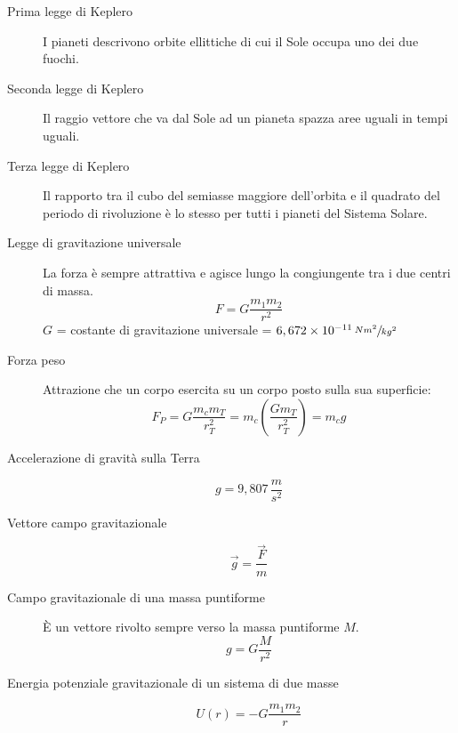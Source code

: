 \documentclass[a4paper,11pt,italian]{article}
\begin{document}
\begin{description}
  \item[Prima legge di Keplero]  
  I pianeti descrivono orbite ellittiche di cui il Sole occupa uno dei due fuochi.
  
  \item[Seconda legge di Keplero] 
  Il raggio vettore che va dal Sole ad un pianeta spazza aree uguali in tempi uguali.
  
  \item[Terza legge di Keplero] 
  Il rapporto tra il cubo del semiasse maggiore dell'orbita e il quadrato del periodo di rivoluzione è lo stesso per tutti i pianeti del Sistema Solare.
  
  \item[Legge di gravitazione universale] 
  La forza è sempre attrattiva e agisce lungo la congiungente tra i due centri di massa. 
  \[ F = G \frac{m_1 m_2}{r^2} \]
  $ G $ = costante di gravitazione universale = $ 6,672 \times 10^{-11} \, \sfrac{Nm^2}{kg^2} $
  
  \item[Forza peso] 
  Attrazione che un corpo esercita su un corpo posto sulla sua superficie: 
  \[ F_P = G \frac{m_{c} m_{T}}{r^2_{T}} =  m_{c} \left(\frac{G m_{T}}{r^2_{T}} \right) = m_{c} g \]
  
  \item[Accelerazione di gravità sulla Terra] 
  \[ g =  9, 807 \, \frac{m}{s^2} \]
  
  \item[Vettore campo gravitazionale] 
  \[ \vec{g} = \frac{\vec{F}}{m} \]
  
  \item[Campo gravitazionale di una massa puntiforme] 
  È un vettore rivolto sempre verso la massa puntiforme $ M $.
  \[ g = G \frac{M}{r^2} \]

%   
%   
  
  \item[Energia potenziale gravitazionale di un sistema di due masse] 
  \[ U(r) = - G \frac{m_1m_2}{r} \]
\end{description}
\end{document}
